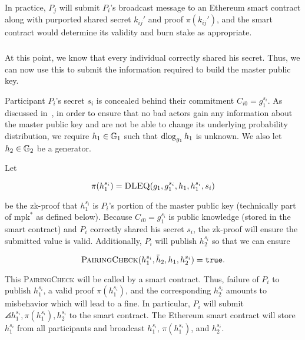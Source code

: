 In practice, $P_{j}$ will submit $P_{i}$'s broadcast message to an
Ethereum smart contract along with purported shared secret $k_{ij}'$
and proof $\pi(k_{ij}')$, and the smart contract would
determine its validity and burn stake as appropriate.





\subsubsection{\KeyShare{}}

At this point, we know that every individual correctly shared his secret.
Thus, we can now use this to submit the information required
to build the master public key.

Participant $P_{i}$'s secret $s_{i}$ is concealed behind
their commitment $C_{i0} = g_{1}^{s_{i}}$.
As discussed in~\cite{gennaro3revisiting,gennaro1999secure,ethdkg},
in order to ensure that no bad actors gain any information
about the master public key and are not be able to change
its underlying probability distribution, we require
$h_{1}\in\mathbb{G}_{1}$ such that $\operatorname{dlog}_{g_{1}}h_{1}$ is unknown.
We also let $h_{2}\in\mathbb{G}_{2}$ be a generator.

Let

\begin{equation}
    \pi(h_{1}^{s_{i}}) = \textsc{DLEQ}(
        g_{1},g_{1}^{s_{i}},h_{1},h_{1}^{s_{i}},s_{i})
\end{equation}

\noindent
be the zk-proof that $h_{1}^{s_{i}}$ is $P_{i}$'s portion
of the master public key (technically part of $\text{mpk}^{*}$
as defined below).
Because $C_{i0} = g_{1}^{s_{i}}$ is public knowledge
(stored in the smart contract)
and $P_{i}$ correctly shared his secret $s_{i}$,
the zk-proof will ensure the submitted value is valid.
Additionally, $P_{i}$ will publish $h_{2}^{s_{i}}$ so that
we can ensure

\begin{equation}
    \textsc{PairingCheck}(h_{1}^{s_{i}},\bar{h}_{2},h_{1},h_{2}^{s_{i}})
        = \texttt{true}.
\end{equation}

\noindent
This \textsc{PairingCheck} will be called by a smart contract.
Thus, failure of $P_{i}$ to publish $h_{1}^{s_{i}}$,
a valid proof $\pi(h_{1}^{s_{i}})$, and the corresponding
$h_{2}^{s_{i}}$ amounts to misbehavior which will
lead to a fine.
In particular, $P_{i}$ will submit
$\angles{h_{1}^{s_{i}}, \pi(h_{1}^{s_{i}}), h_{2}^{s_{i}}}$
to the smart contract.
The Ethereum smart contract will store $h_{1}^{s_{i}}$ from
all participants and broadcast
$h_{1}^{s_{i}}$, $\pi(h_{1}^{s_{i}})$, and $h_{2}^{s_{i}}$.


